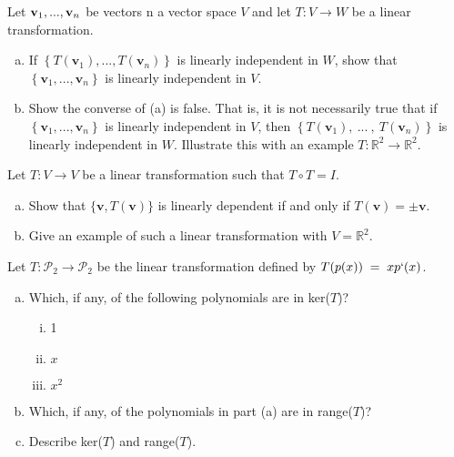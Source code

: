 \documentclass[11pt,letterpaper,boxed]{pset}
\begin{document}
    \begin{problem} [6.4 \#24]
    Let $\textbf{\textbf{v}}_1, ..., \textbf{v}_n$ be vectors n a vector space $V$ and let $T: V\xrightarrow{} W$ be a linear transformation.
    
    \begin{enumerate} [(a)]
        \item If $\left\{T(\textbf{v}_1), ..., T(\textbf{v}_n)\right\}$ is linearly independent in $W$, show that $\left\{\textbf{v}_1, ..., \textbf{v}_n\right\}$ is linearly independent in $V$.
        \item Show the converse of (a) is false. That is, it is not necessarily true that if $\left\{\textbf{v}_1, ..., \textbf{v}_n\right\}$ is linearly independent in $V$, then $\left\{T(\textbf{v}_1),\: ...\: ,\:T(\textbf{v}_n)\right\}$ is linearly independent in $W$. Illustrate this with an example $T: \mathbb{R}^2\xrightarrow{}\mathbb{R}^2$.
    \end{enumerate}
    
    \end{problem}
    \newpage
    
    
    \begin{problem} [6.4 \#32]
    Let $T:V\xrightarrow{}V$ be a linear transformation such that $T\circ T = I$.
    
    \begin{enumerate} [(a)]
        \item Show that $\{\textbf{v},T(\textbf{v})\}$ is linearly dependent if and only if $T(\textbf{v}) = \pm \textbf{v}$.
        \item Give an example of such a linear transformation with $V=\mathbb{R}^2$.
    \end{enumerate}
    
    \end{problem}
    \newpage
    
    \begin{problem} [6.5 \#4]
    Let $T:\mathscr{P}_2 \xrightarrow{} \mathscr{P}_2$ be the linear transformation defined by $T(p(x))\;=\;xp`(x)$.
    
    \begin{enumerate} [(a)]
        \item Which, if any, of the following polynomials are in ker($T$)?
        \begin{enumerate} [(i)]
            \item 1
            \item $x$
            \item $x^2$
        \end{enumerate}
        \item Which, if any, of the polynomials in part (a) are in range($T$)?
        \item Describe ker($T$) and range($T$).
    \end{enumerate}
    \end{problem}
    \newpage
    
\end{document}
